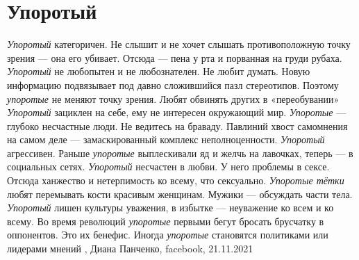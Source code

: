  
 
 
 
 
\chapter{Упоротый}

\emph{Упоротый} категоричен. Не слышит и не хочет слышать противоположную точку
зрения — она его убивает. Отсюда — пена у рта и порванная на груди рубаха.
\emph{Упоротый} не любопытен и не любознателен. Не любит думать. Новую
информацию подвязывает под давно сложившийся пазл стереотипов. Поэтому
\emph{упоротые} не меняют точку зрения. Любят обвинять других в «переобувании»
\emph{Упоротый} зациклен на себе, ему не интересен окружающий мир.
\emph{Упоротые} — глубоко несчастные люди. Не ведитесь на браваду. Павлиний
хвост самомнения на самом деле —  замаскированный комплекс неполноценности.
\emph{Упоротый} агрессивен. Раньше \emph{упоротые} выплескивали яд и желчь на
лавочках, теперь — в социальных сетях.  \emph{Упоротый} несчастен в любви. У
него проблемы в сексе. Отсюда ханжество и нетерпимость ко всему, что
сексуально. \emph{Упоротые тётки} любят перемывать кости красивым женщинам.
Мужики — обсуждать части тела.  \emph{Упоротый} лишен культуры уважения, в
избытке — неуважение ко всем и ко всему.  Во время революций \emph{упоротые}
первыми бегут бросать брусчатку в оппонентов. Это их бенефис.  Иногда
\emph{упоротые} становятся политиками или лидерами мнений
, Диана Панченко, facebook, 21.11.2021 
